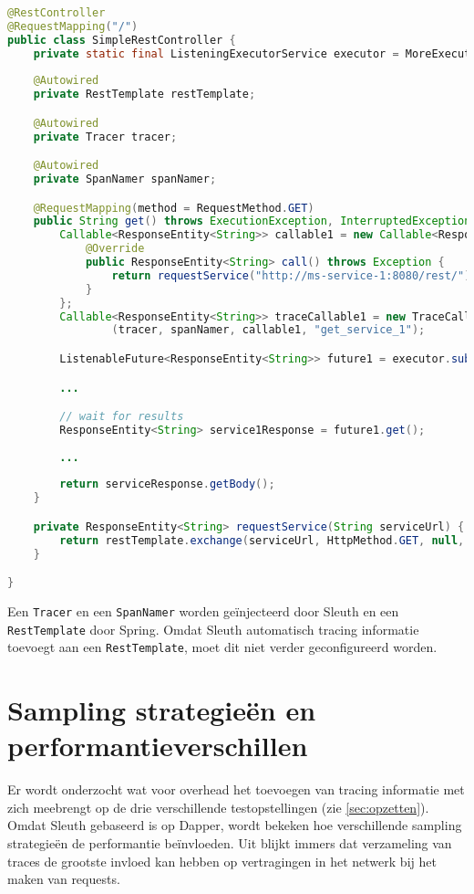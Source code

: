 \begin{lstlisting}[language=Java, basicstyle=\ttfamily\scriptsize, caption=Asynchrone REST communicatie]
@RestController
@RequestMapping("/")
public class SimpleRestController {
    private static final ListeningExecutorService executor = MoreExecutors.listeningDecorator(Executors.newCachedThreadPool());
    
    @Autowired
    private RestTemplate restTemplate;

    @Autowired
    private Tracer tracer;

    @Autowired
    private SpanNamer spanNamer;

    @RequestMapping(method = RequestMethod.GET)
    public String get() throws ExecutionException, InterruptedException {
        Callable<ResponseEntity<String>> callable1 = new Callable<ResponseEntity<String>>() {
            @Override
            public ResponseEntity<String> call() throws Exception {
                return requestService("http://ms-service-1:8080/rest/");
            }
        };
        Callable<ResponseEntity<String>> traceCallable1 = new TraceCallable<>
                (tracer, spanNamer, callable1, "get_service_1");

        ListenableFuture<ResponseEntity<String>> future1 = executor.submit(traceCallable1);

        ...

        // wait for results
        ResponseEntity<String> service1Response = future1.get();
        
        ...
        
        return serviceResponse.getBody();
    }

    private ResponseEntity<String> requestService(String serviceUrl) {
        return restTemplate.exchange(serviceUrl, HttpMethod.GET, null, String.class);
    }

}
\end{lstlisting}

Een \texttt{Tracer} en een \texttt{SpanNamer} worden geïnjecteerd door Sleuth en een \texttt{RestTemplate} door Spring. Omdat Sleuth automatisch tracing informatie toevoegt aan een \texttt{RestTemplate}, moet dit niet verder geconfigureerd worden.

\section{Sampling strategieën en performantieverschillen}
\label{sec:sampling}

Er wordt onderzocht wat voor overhead het toevoegen van tracing informatie met zich meebrengt op de drie verschillende testopstellingen (zie \ref{sec:opzetten}). Omdat Sleuth gebaseerd is op Dapper, wordt bekeken hoe verschillende sampling strategieën de performantie beïnvloeden. Uit \autocite{Sigelman2010} blijkt immers dat verzameling van traces de grootste invloed kan hebben op vertragingen in het netwerk bij het maken van requests.

